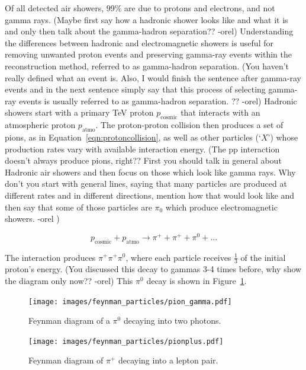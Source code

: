  Of all detected air showers, \nicetilde{}99\% are due to protons and electrons, and not gamma rays.
  {\color{red}(Maybe first say how a hadronic shower looks like and what it is and only then talk about the gamma-hadron separation?? -orel)}
  Understanding the differences between hadronic and electromagnetic showers is useful for removing unwanted proton events and preserving gamma-ray events within the reconstruction method, referred to as gamma-hadron separation.
  {\color{red}(You haven't really defined what an event is. Also, I would finish the sentence after gamma-ray events and in the next sentence simply say that this process of selecting gamma-ray events is usually referred to as gamma-hadron separation. ?? -orel)}
  Hadronic showers start with a primary \nicetilde TeV proton $p_{\textrm{cosmic}}$ that interacts with an atmospheric proton $p_{\textrm{atmo}}$.
  The proton-proton collision then produces a set of pions, as in Equation~\ref{eqn:protoncollision}, as well as other particles (`$X$') whose production rates vary with available interaction energy.
  {\color{red}(The pp interaction doesn't always produce pions, right?? First you should talk in general about Hadronic air showers and then focus on those which look like gamma rays. Why don't you start with general lines, saying that many particles are produced at different rates and in different directions, mention how that would look like and then say that some of those particles are $\pi_0$ which produce electromagnetic showers. -orel )}
  
  \begin{equation}\label{eqn:protoncollision}
    p_{\textrm{cosmic}} + p_{\textrm{atmo}} \rightarrow \pi^+ + \pi^+ + \pi^0 + ...
  \end{equation}
  
  The interaction produces $\pi^+\pi^+\pi^0$, where each particle receives \nicetilde $\frac{1}{3}$ of the initial proton's energy.
  {\color{red}(You discussed this decay to gammas 3-4 times before, why show the diagram only now?? -orel)}
  This $\pi^{0}$ decay is shown in Figure~\ref{fig:feynman_pi0}.
  
  \begin{figure}[ht]
    \centering
    \texttt{[image: images/feynman\_particles/pion\_gamma.pdf]}
    \caption[Feynman Diagram of $\pi^{0}$ Decay]{
      Feynman diagram of a $\pi^{0}$ decaying into two photons.
      \CaptionBlankLine
    }
    \label{fig:feynman_pi0}
  \end{figure}

  \begin{figure}[ht]
    \centering
    \texttt{[image: images/feynman\_particles/pionplus.pdf]}
    \caption[Feynman Diagram of $\pi^{+}$ Decay]{
      Feynman diagram of $\pi^{+}$ decaying into a lepton pair.
      \CaptionBlankLine
    }
    \label{fig:feynman_piplus}
  \end{figure}
  
